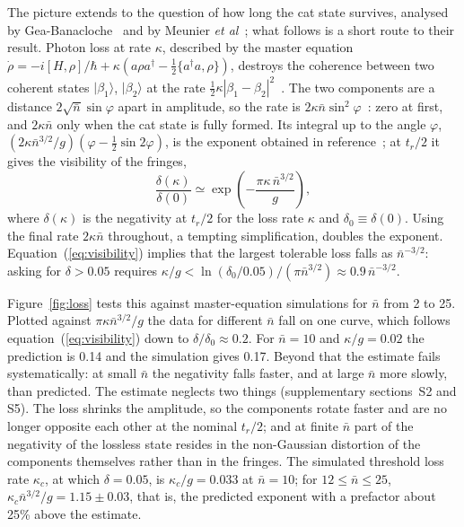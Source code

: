 \documentclass{iopjournal}
\newcommand{\nbar}{\bar{n}}
\newcommand{\ket}[1]{|#1\rangle}
\begin{document}
The picture extends to the question of how long the cat state survives, analysed by Gea-Banacloche~\cite{gea-banacloche1993} and by Meunier \textit{et al}~\cite{meunier2006}; what follows is a short route to their result. Photon loss at rate $\kappa$, described by the master equation $\dot\rho = -i[H,\rho]/\hbar + \kappa(a\rho a^\dagger - \tfrac12\{a^\dagger a,\rho\})$, destroys the coherence between two coherent states $\ket{\beta_1}$, $\ket{\beta_2}$ at the rate $\tfrac12\kappa|\beta_1-\beta_2|^2$~\cite{walls1985, haroche2006}. The two components are a distance $2\sqrt{\nbar}\sin\varphi$ apart in amplitude, so the rate is $2\kappa\nbar\sin^2\varphi$~\cite{auffeves2003}: zero at first, and $2\kappa\nbar$ only when the cat state is fully formed. Its integral up to the angle $\varphi$, $(2\kappa\nbar^{3/2}/g)(\varphi-\tfrac12\sin2\varphi)$, is the exponent obtained in reference~\cite{meunier2006}; at $t_r/2$ it gives the visibility of the fringes,
\begin{equation}
\frac{\delta(\kappa)}{\delta(0)} \simeq \exp\!\left(-\frac{\pi\kappa\,\nbar^{3/2}}{g}\right),
\label{eq:visibility}
\end{equation}
where $\delta(\kappa)$ is the negativity at $t_r/2$ for the loss rate $\kappa$ and $\delta_0\equiv\delta(0)$. Using the final rate $2\kappa\nbar$ throughout, a tempting simplification, doubles the exponent. Equation~(\ref{eq:visibility}) implies that the largest tolerable loss falls as $\nbar^{-3/2}$: asking for $\delta > 0.05$ requires $\kappa/g < \ln(\delta_0/0.05)/(\pi\nbar^{3/2}) \approx 0.9\,\nbar^{-3/2}$.

Figure~\ref{fig:loss} tests this against master-equation simulations for $\nbar$ from 2 to 25. Plotted against $\pi\kappa\nbar^{3/2}/g$ the data for different $\nbar$ fall on one curve, which follows equation~(\ref{eq:visibility}) down to $\delta/\delta_0\approx 0.2$. For $\nbar = 10$ and $\kappa/g = 0.02$ the prediction is 0.14 and the simulation gives 0.17. Beyond that the estimate fails systematically: at small $\nbar$ the negativity falls faster, and at large $\nbar$ more slowly, than predicted. The estimate neglects two things (supplementary sections~S2 and S5). The loss shrinks the amplitude, so the components rotate faster and are no longer opposite each other at the nominal $t_r/2$; and at finite $\nbar$ part of the negativity of the lossless state resides in the non-Gaussian distortion of the components themselves rather than in the fringes. The simulated threshold loss rate $\kappa_c$, at which $\delta = 0.05$, is $\kappa_c/g = 0.033$ at $\nbar = 10$; for $12\leq\nbar\leq25$, $\kappa_c\nbar^{3/2}/g = 1.15\pm0.03$, that is, the predicted exponent with a prefactor about 25\% above the estimate.
\end{document}
